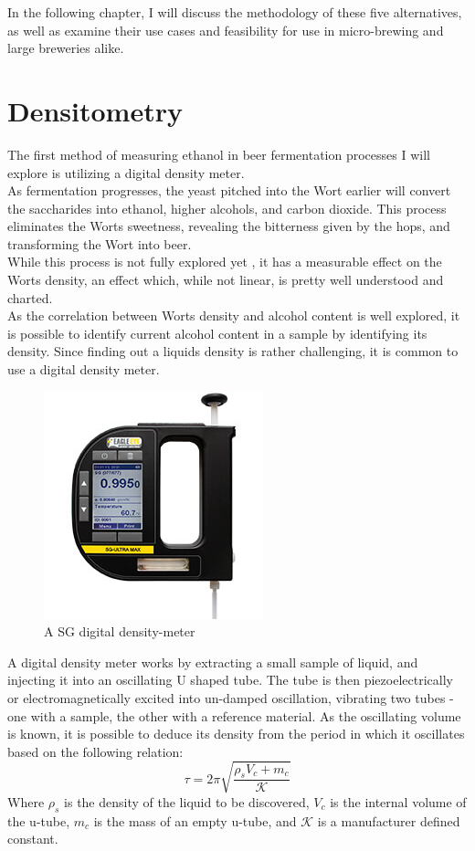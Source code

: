 \documentclass[twoside]{ctuthesis}
\theoremstyle{plain}
\theoremstyle{definition}
\theoremstyle{note}
\begin{document}
In the following chapter, I will discuss the methodology of these five alternatives, as well as examine their use cases and feasibility for use in micro-brewing and large breweries alike.

\newpage

\section{Densitometry}
The first method of measuring ethanol in beer fermentation processes I will explore is utilizing a digital density meter.\\
As fermentation progresses, the yeast pitched into the Wort earlier will convert the saccharides into ethanol, higher alcohols, and carbon dioxide. This process eliminates the Worts sweetness, revealing the bitterness given by the hops, and transforming the Wort into beer. \\
While this process is not fully explored yet \cite{Brewing_Science}, it has a measurable effect on the Worts density, an effect which, while not linear, is pretty well understood and charted.\\
As the correlation between Worts density and alcohol content is well explored, it is possible to identify current alcohol content in a sample by identifying its density. Since finding out a liquids density is rather challenging, it is common to use a digital density meter\cite{Ethanol_Measurement}.\\

\begin{figure}[H]
	\centering
	\includegraphics[scale = 0.6]{sg-ultra-max-digital-densitymeter-d}
	\caption{A SG digital density-meter}
\end{figure}

A digital density meter works by extracting a small sample of liquid, and injecting it into an oscillating U shaped tube. The tube is then piezoelectrically or electromagnetically excited into un-damped oscillation, vibrating two tubes - one with a sample, the other with a reference material. As the oscillating volume is known, it is possible to deduce its density from the period in which it oscillates based on the following relation:
\begin{equation}
	\tau = 2\pi \sqrt{\frac{\rho_sV_c+m_c}{\mathcal{K}}}
\end{equation}
Where $\rho_s$ is the density of the liquid to be discovered, $V_c$ is the internal volume of the u-tube, $m_c$ is the mass of an empty u-tube, and $\mathcal{K}$ is a manufacturer defined constant.\\
\end{document}
